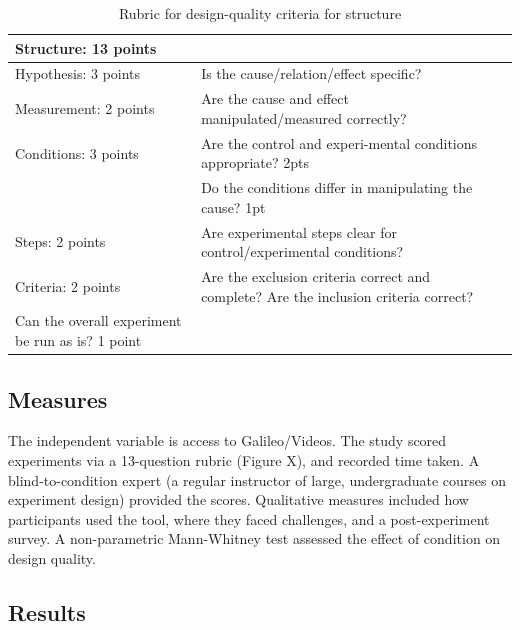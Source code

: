 \vspace{0.25in}
\begin{table}[!ht]
\caption[Rubric for design-quality criteria for structure]
{Rubric for design-quality criteria for structure}

\vspace{-0.25in}
\begin{center}
\begin{tabular}{|p{1in}|p{2in}|p{3in}|}
\hline
Structure: 13 points &  \\
\hline
Hypothesis: 3 points & Is the cause/relation/effect specific?  \\
\hline
Measurement: 2 points & Are the cause and effect manipulated/measured correctly? \\
\hline
Conditions: 3 points  & Are the control and experi-mental conditions appropriate? 2pts \\
 & Do the conditions differ in manipulating the cause? 1pt \\
\hline
Steps: 2 points  & Are experimental steps clear for control/experimental conditions?  \\
\hline
Criteria: 2 points & Are the exclusion criteria correct and complete? Are the inclusion criteria correct? \\
\hline
Can the overall experiment be run as is? 1 point \\
\hline
\end{tabular}
\end{center}
\label{tab:rubric1}
\end{table}

\subsection{Measures}
The independent variable is access to Galileo/Videos. The study scored experiments via a 13-question rubric (Figure X), and recorded time taken. A blind-to-condition expert (a regular instructor of large, undergraduate courses on experiment design) provided the scores. Qualitative measures included how participants used the tool, where they faced challenges, and a post-experiment survey. A non-parametric Mann-Whitney test assessed the effect of condition on design quality. 

\subsection{Results}

